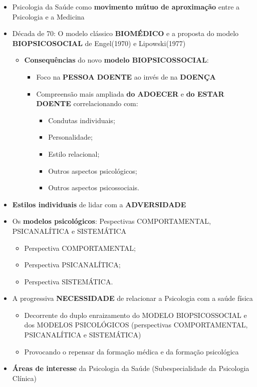 \documentclass[
]{book}
\providecommand{\tightlist}{%
  \setlength{\itemsep}{0pt}\setlength{\parskip}{0pt}}
\begin{document}
\begin{itemize}
\tightlist
\item
  Psicologia da Saúde como \textbf{movimento mútuo de aproximação} entre
  a Psicologia e a Medicina
\item
  Década de 70: O modelo clássico \textbf{BIOMÉDICO} e a proposta do
  modelo \textbf{BIOPSICOSOCIAL} de Engel(1970) e Lipowski(1977)

  \begin{itemize}
  \tightlist
  \item
    \textbf{Consequências} do novo \textbf{modelo BIOPSICOSSOCIAL}:

    \begin{itemize}
    \tightlist
    \item
      Foco na \textbf{PESSOA DOENTE} ao invés de na \textbf{DOENÇA}
    \item
      Compreensão mais ampliada \textbf{do ADOECER} e \textbf{do ESTAR
      DOENTE} correlacionando com:

      \begin{itemize}
      \tightlist
      \item
        Condutas individuais;
      \item
        Personalidade;
      \item
        Estilo relacional;
      \item
        Outros aspectos psicológicos;
      \item
        Outros aspectos psicossociais.
      \end{itemize}
    \end{itemize}
  \end{itemize}
\item
  \textbf{Estilos individuais} de lidar com a \textbf{ADVERSIDADE}
\item
  Os \textbf{modelos psicológicos}: Pespectivas COMPORTAMENTAL,
  PSICANALÍTICA e SISTEMÁTICA

  \begin{itemize}
  \tightlist
  \item
    Perspectiva COMPORTAMENTAL;
  \item
    Perspectiva PSICANALÍTICA;
  \item
    Perspectiva SISTEMÁTICA.
  \end{itemize}
\item
  A progressiva \textbf{NECESSIDADE} de relacionar a Psicologia com a
  saúde física

  \begin{itemize}
  \tightlist
  \item
    Decorrente do duplo enraizamento do MODELO BIOPSICOSSOCIAL e dos
    MODELOS PSICOLÓGICOS (perspectivas COMPORTAMENTAL, PSICANALÍTICA e
    SISTEMÁTICA)
  \item
    Provocando o repensar da formação médica e da formação psicológica
  \end{itemize}
\item
  \textbf{Áreas de interesse} da Psicologia da Saúde (Subespecialidade
  da Psicologia Clínica)


\end{itemize}
\end{document}
